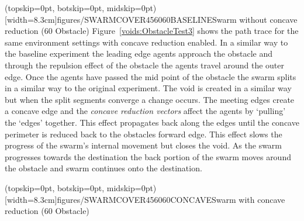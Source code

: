 \documentclass{ieeeaccess}
\begin{document}
\Figure[t!](topskip=0pt, botskip=0pt, midskip=0pt)[width=8.3cm]{figures/SWARMCOVER456060BASELINE}{Swarm without concave reduction (60 Obstacle)\label{voids:ObstacleTest2}}
Figure~\ref{voids:ObstacleTest3} shows the path trace for the same environment settings with concave reduction enabled. In a similar way to the baseline experiment the leading edge agents approach the obstacle and through the repulsion effect of the obstacle the agents travel around the outer edge. Once the agents have passed the mid point of the obstacle the swarm splits in a similar way to the original experiment. The void is created in a similar way but when the split segments converge a change occurs. The meeting edges create a concave edge and the \textit{concave reduction vectors} affect the agents by `pulling' the `edges' together. This effect propagates back along the edges until the concave perimeter is reduced back to the obstacles forward edge. This effect slows the progress of the swarm's internal movement but closes the void. As the swarm progresses towards the destination the back portion of the swarm moves around the obstacle and swarm continues onto the destination.

\Figure[t!](topskip=0pt, botskip=0pt, midskip=0pt)[width=8.3cm]{figures/SWARMCOVER456060CONCAVE}{Swarm with concave reduction (60 Obstacle)\label{voids:ObstacleTest3}}
\end{document}
